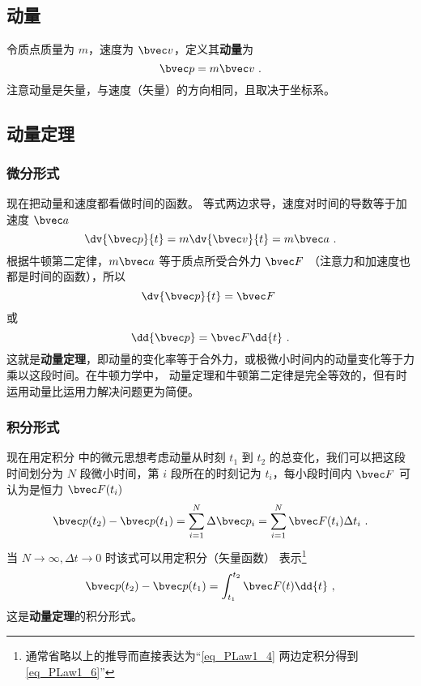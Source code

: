 
\subsection{动量}
令质点质量为 $m$，速度为 $\bvec v$，定义其\textbf{动量}为
\begin{equation}
\bvec p = m\bvec v~.
\end{equation}
注意动量是矢量，与速度（矢量）的方向相同，且取决于坐标系。

\subsection{动量定理}
\subsubsection{微分形式}
现在把动量和速度都看做时间的函数。 等式两边求导，速度对时间的导数等于加速度 $\bvec a$
\begin{equation}
\dv{\bvec p}{t} = m \dv{\bvec v}{t} = m\bvec a~.
\end{equation}
根据牛顿第二定律，$m\bvec a$ 等于质点所受合外力 $\bvec F$ （注意力和加速度也都是时间的函数），所以
\begin{equation}
\dv{\bvec p}{t} = \bvec F~
\end{equation}
或
\begin{equation}\label{eq_PLaw1_4}
\dd{\bvec p} = \bvec F \dd{t}~.
\end{equation}
这就是\textbf{动量定理}，即动量的变化率等于合外力，或极微小时间内的动量变化等于力乘以这段时间。在牛顿力学中， 动量定理和牛顿第二定律是完全等效的，但有时运用动量比运用力解决问题更为简便。
\subsubsection{积分形式}
现在用定积分 中的微元思想考虑动量从时刻 $t_1$ 到 $t_2$ 的总变化，我们可以把这段时间划分为 $N$ 段微小时间，第 $i$ 段所在的时刻记为 $t_i$，每小段时间内 $\bvec F$ 可认为是恒力 $\bvec F(t_i)$
\begin{equation}
\bvec p(t_2)-\bvec p(t_1) = \sum_{i=1}^{N} \Delta\bvec p_i= \sum_{i=1}^{N} \bvec F(t_i) \Delta t_i~.
\end{equation}
当 $N\to\infty, \Delta t\to 0$ 时该式可以用定积分（矢量函数）%
表示\footnote{通常省略以上的推导而直接表达为“\autoref{eq_PLaw1_4} 两边定积分得到\autoref{eq_PLaw1_6}”}
\begin{equation}\label{eq_PLaw1_6}
\bvec p(t_2)-\bvec p(t_1) = \int_{t_1}^{t_2}\bvec F(t) \dd{t}~,
\end{equation}
这是\textbf{动量定理}的积分形式。


